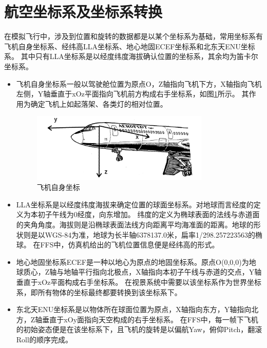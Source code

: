 \section{航空坐标系及坐标系转换}
在模拟飞行中，涉及到位置和旋转的数据都是以某个坐标系为基础，常用坐标系有飞机自身坐标系、经纬高LLA坐标系、地心地固ECEF坐标系和北东天ENU坐标系。
其中只有LLA坐标系是以经度纬度海拔确认位置的坐标系，其余均为笛卡尔坐标系。
\begin{itemize}
    \item [（1）]
    飞机自身坐标系一般以驾驶舱位置为原点O，Z轴指向飞机下方，X轴指向飞机左侧，Y轴垂直于xOz平面指向飞机前方构成右手坐标系，如图\ref{crood1}所示。
    其作用为确定飞机上如起落架、各类灯的相对位置\cite{crood4}。
    \begin{figure}[h!]
        \begin{center}
            \includegraphics[width=0.8\textwidth]{pictures/plane.png}
            \caption{飞机自身坐标}
            \label{crood1}
        \end{center}
    \end{figure}
    \item [（2）]
    LLA坐标系是以经度纬度海拔来确定位置的球面坐标系。对地球而言经度的定义为本初子午线为0经度，向东增加。
    纬度的定义为椭球表面的法线与赤道面的夹角角度。海拔则是沿椭球表面法线方向距离平均海准面的距离。地球的形状则是以WGS-84为准，地球为长半轴6378137.0米，扁率1/298.257223563的椭球\cite{crood1}。
    在FFS中，仿真机给出的飞机位置信息便是经纬高的形式。
    \item [（3）]
    地心地固坐标系ECEF是一种以地心为原点的地固坐标系。原点O(0,0,0)为地球质心，Z轴与地轴平行指向北极点，X轴指向本初子午线与赤道的交点，Y轴垂直于xOz平面构成右手坐标系\cite{crood2}。
    在视景系统中需要以该坐标系作为世界坐标系，即所有物体的坐标最终都要转换到该坐标系下。
    \item [（4）]
    东北天ENU坐标系是以物体所在球面位置为原点，X轴指向东方，Y轴指向北方，Z轴垂直于xOy面指向天空构成的右手坐标系\cite{crood3}。
    在FFS中，每一帧下飞机的初始姿态便是在该坐标系下，且飞机的旋转是以偏航Yaw，俯仰Pitch，翻滚Roll的顺序完成。
    \begin{figure}[h!]

\end{figure}
\end{itemize}
